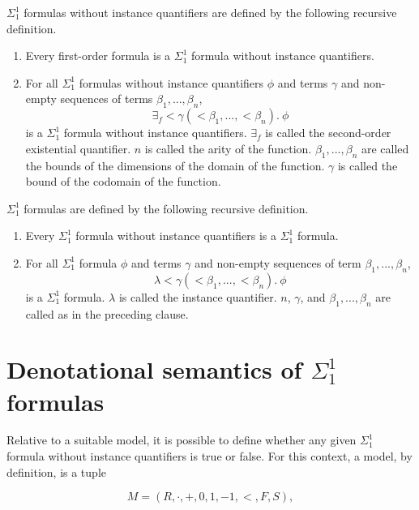 \documentclass[11pt]{article}
\begin{document}
$\Sigma^1_1$ formulas without instance quantifiers are defined by the following recursive definition.

\begin{enumerate}
	\item Every first-order formula is a $\Sigma^1_1$ formula without instance quantifiers.
	\item For all $\Sigma^1_1$ formulas without instance quantifiers $\phi$ and terms $\gamma$ and non-empty sequences of terms $\beta_1, ..., \beta_n$,
		\begin{equation}
			\exists_f <\gamma (<\beta_1, ..., <\beta_n).\ \phi
		\end{equation}
		is a $\Sigma^1_1$ formula without instance quantifiers. $\exists_f$ is called the second-order existential quantifier. $n$ is called the arity of the function. $\beta_1, ..., \beta_n$ are called the bounds of the dimensions of the domain of the function. $\gamma$ is called the bound of the codomain of the function.
\end{enumerate}

$\Sigma^1_1$ formulas are defined by the following recursive definition.

\begin{enumerate}
	\item Every $\Sigma^1_1$ formula without instance quantifiers is a $\Sigma^1_1$ formula.
	\item For all $\Sigma^1_1$ formula $\phi$ and terms $\gamma$ and non-empty sequences of term $\beta_1, ..., \beta_n$,
		\begin{equation}
			\lambda <\gamma (<\beta_1, ..., <\beta_n).\ \phi
		\end{equation}
		is a $\Sigma^1_1$ formula. $\lambda$ is called the instance quantifier. $n$, $\gamma$, and $\beta_1, ..., \beta_n$ are called as in the preceding clause.
\end{enumerate}


\section{Denotational semantics of $\Sigma^1_1$ formulas}

Relative to a suitable model, it is possible to define whether any given
$\Sigma^1_1$ formula without instance quantifiers is true or false.
For this context, a model, by definition, is a tuple

\begin{equation}
	M = (R, \cdot, +, 0, 1, -1, <, F, S),
\end{equation}
\end{document}
